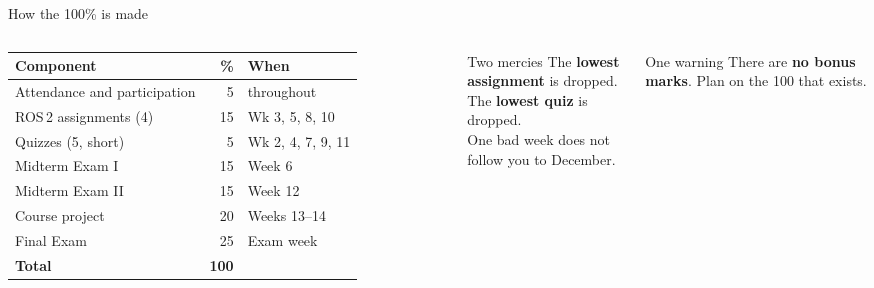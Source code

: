 \documentclass[aspectratio=169]{beamer}
\begin{document}
\begin{frame}{How the 100\% is made}
  \small
  \begin{columns}[T,onlytextwidth]
    \begin{tabular}{@{}lrl@{}}
      \toprule
      \textbf{Component} & \textbf{\%} & \textbf{When} \\
      \midrule
      Attendance and participation & 5  & throughout \\
      ROS\,2 assignments (4) & 15 & Wk 3, 5, 8, 10 \\
      Quizzes (5, short)     & 5  & Wk 2, 4, 7, 9, 11 \\
      Midterm Exam I         & 15 & Week 6 \\
      Midterm Exam II        & 15 & Week 12 \\
      Course project         & 20 & Weeks 13--14 \\
      Final Exam             & 25 & Exam week \\
      \midrule
      \textbf{Total}         & \textbf{100} & \\
      \bottomrule
    \end{tabular}

    \begin{block}{\small Two mercies}
      \footnotesize
      The \textbf{lowest assignment} is dropped.\\
      The \textbf{lowest quiz} is dropped.\\[0.4em]
      One bad week does not follow you to December.
    \end{block}
    \begin{block}{\small One warning}
      \footnotesize
      There are \textbf{no bonus marks}. Plan on the 100 that exists.
    \end{block}
  \end{columns}
\end{frame}
\end{document}
